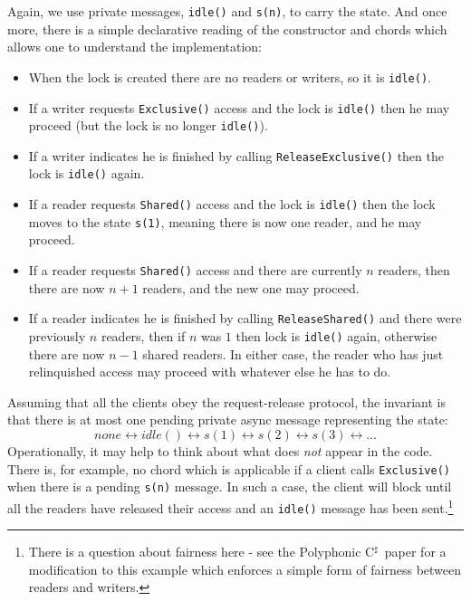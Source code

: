 \documentclass{article}
\newcommand{\csharp}{\mbox{C$^\sharp$}}
\begin{document}
Again, we use private messages, \verb|idle()| and \verb|s(n)|, to carry the state. And once more, there is a simple declarative reading  of the constructor and chords which allows one to understand the implementation:
\begin{itemize}
\item When the lock is created there are no readers or writers, so it
is \verb|idle()|.
\item If a writer requests \verb|Exclusive()| access and the lock is
\verb|idle()| then he may proceed (but the lock is no longer
\verb|idle()|).
\item If a writer indicates he is finished by calling
\verb|ReleaseExclusive()| then the lock is \verb|idle()| again.
\item If a reader requests \verb|Shared()| access and the lock is
\verb|idle()| then the lock moves to the state \verb|s(1)|, meaning
there is now one reader, and he may proceed.
\item If a reader requests \verb|Shared()| access and there are
currently $n$ readers, then there are now $n+1$ readers, and the new
one may proceed.
\item If a reader indicates he is finished by calling
\verb|ReleaseShared()| and there were previously $n$ readers, then if $n$
was $1$ then lock is \verb|idle()| again, otherwise there are now $n-1$ shared
readers. In either case, the reader who has just relinquished access
may proceed with whatever else he has to do.
\end{itemize}

Assuming that all the clients obey the request-release protocol, the
invariant is that there is at most one pending private async message
representing the state:
\[
      none \leftrightarrow idle() \leftrightarrow s(1) 
\leftrightarrow s(2) \leftrightarrow s(3) \leftrightarrow\ldots
\]
Operationally, it may help to think about what does \emph{not} appear in the
code. There is, for example, no chord which is applicable if a client
calls \verb|Exclusive()| when there is a pending \verb|s(n)| message. In such a
case, the client will block until all the readers have released their
access and an \verb|idle()| message has been sent.\footnote{There is a question about
fairness here - see the Polyphonic \csharp\ paper for a modification
to this example which enforces a simple form of fairness between
readers and writers.}
\end{document}
